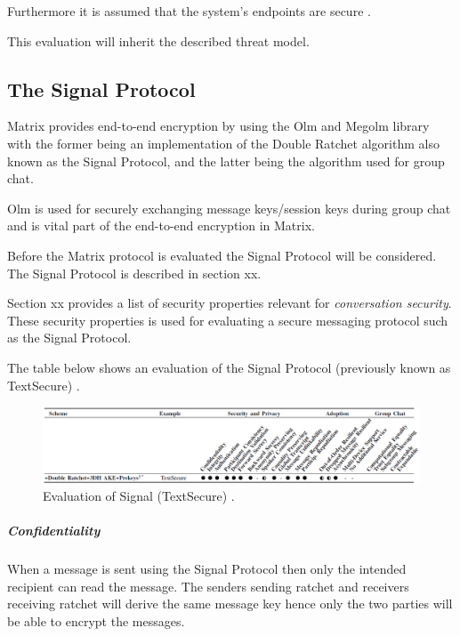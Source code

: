 Furthermore it is assumed that the system's endpoints are secure \cite{sok}.

This evaluation will inherit the described threat model.

\subsection{The Signal Protocol}
Matrix provides end-to-end encryption by using the Olm and Megolm library with the former being an implementation of the Double Ratchet algorithm also known as the Signal Protocol, and the latter being the algorithm used for group chat. 

Olm is used for securely exchanging message keys/session keys during group chat and is vital part of the end-to-end encryption in Matrix.

Before the Matrix protocol is evaluated the Signal Protocol will be considered. The Signal Protocol is described in section xx. 

Section xx provides a list of security properties relevant for \emph{conversation security}. These security properties is used for evaluating a secure messaging protocol such as the Signal Protocol.

The table below shows an evaluation of the Signal Protocol (previously known as TextSecure) \cite{sok}. 

\begin{figure}[H]
	\hspace*{-1.7cm} 
	\centering
	\includegraphics[width=16cm]{figures/framework_signal.png}
	\caption{Evaluation of Signal (TextSecure) \cite{sok}.}
	\label{fig:framework_signal}
\end{figure}




\subparagraph{Confidentiality} When a message is sent using the Signal Protocol then only the intended recipient can read the message. The senders sending ratchet and receivers receiving ratchet will derive the same message key hence only the two parties will be able to encrypt the messages. 

